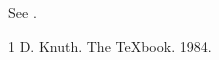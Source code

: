 \documentclass{article}
\begin{document}
See \citet{k}.
\begin{thebibliography}{1}
 D. Knuth. The TeXbook. 1984.
\end{thebibliography}
\end{document}
